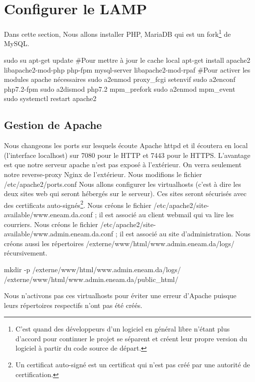 \documentclass[a4paper,12pt,french]{report} %
\begin{document}
\section{Configurer le LAMP}
Dans cette section, Nous allons installer PHP, MariaDB qui est un fork\footnote{C'est quand des développeurs d'un logiciel en général libre n'étant plus d'accord pour continuer le projet se séparent et créent leur propre version du logiciel à partir du code source de départ.} de MySQL.
\begin{exempleConsole}
sudo su
apt-get update #Pour mettre à jour le cache local
apt-get install apache2 libapache2-mod-php php-fpm mysql-server libapache2-mod-rpaf
#Pour activer les modules apache nécessaires
sudo a2enmod proxy_fcgi setenvif
sudo a2enconf php7.2-fpm
sudo a2dismod php7.2 mpm_prefork
sudo a2enmod mpm_event
sudo systemctl restart apache2
\end{exempleConsole}

\subsection{Gestion de Apache}
Nous changeons les ports sur lesquels écoute Apache httpd et il écoutera en local (l'interface localhost) sur 7080 pour le HTTP et 7443 pour le HTTPS. L'avantage est que notre serveur apache n'est pas exposé à l'extérieur. On verra seulement notre reverse-proxy Nginx de l'extérieur. Nous modifions le fichier /etc/apache2/ports.conf
Nous allons configurer les virtualhosts (c'est à dire les deux sites web qui seront hébergés sur le serveur). Ces sites seront sécurisés avec des certificats auto-signés\footnote{Un certificat auto-signé est un certificat qui n'est pas créé par une autorité de certification.}.\label{ref:rainloop}
Nous créons le fichier /etc/apache2/site-available/www.eneam.da.conf ; il est associé au client webmail qui va lire les courriers.
\cesure
{}
\nocesure
Nous créons le fichier /etc/apache2/site-available/www.admin.eneam.da.conf ; il est associé au site d'administration. 
\cesure
{}
\nocesure
Nous créons aussi les répertoires /externe/www/html/www.admin.eneam.da/logs/ récursivement.
\begin{exempleConsole}
mkdir -p /externe/www/html/www.admin.eneam.da/logs/ /externe/www/html/www.admin.eneam.da/public_html/
\end{exempleConsole}
Nous n'activons pas ces virtualhosts pour éviter une erreur d'Apache puisque leurs répertoires respectifs n'ont pas été créés.
\end{document}
